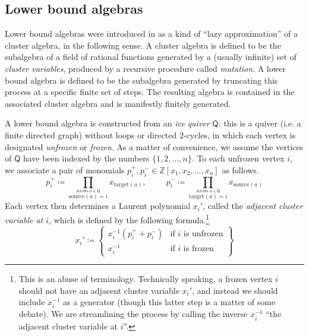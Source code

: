 \documentclass[10pt]{amsart}
\numberwithin{equation}{section}
\theoremstyle{definition}
\theoremstyle{remark}
\newcommand{\1}{^{-1}}
\def\ZZ{\mathbb{Z}}
\def\Q{\mathsf{Q}}
\begin{document}
\subsection{Lower bound algebras}

Lower bound algebras were introduced in \cite{BFZ05} as a kind of ``lazy approximation'' of a cluster algebra, in the following sense.  A cluster algebra is defined to be the subalgebra of a field of rational functions generated by a (usually infinite) set of \emph{cluster variables}, produced by a recursive procedure called \emph{mutation}.  A lower bound algebra is defined to be the subalgebra generated by truncating this process at a specific finite set of steps.  The resulting algebra is contained in the associated cluster algebra and is manifestly finitely generated.

A lower bound algebra is constructed from an \textit{ice quiver} $\Q$: this is a quiver (i.e. a finite directed graph) without loops or directed $2$-cycles, in which each vertex is designated \textit{unfrozen} or \textit{frozen}.
As a matter of convenience, we assume the vertices of $\Q$ have been indexed by the numbers $\{1,2,\dots,n\}$.  To each unfrozen vertex $i$, we associate a pair of monomials $p_i^+,p_i^-\in \ZZ[x_1,x_2,\dots,x_n]$ as follows.
\begin{equation}
p_i^+ \coloneqq \prod_{\stackrel{\text{arrows }a\in \Q}{\text{source}(a)=i}}x_{\text{target}(a)},\hspace{1cm} p_i^- \coloneqq \prod_{\stackrel{\text{arrows }a\in \Q}{\text{target}(a)=i}}x_{\text{source}(a)}
\end{equation}
Each vertex then determines a Laurent polynomial $x_i'$, called the \textit{adjacent cluster variable at $i$}, which is defined by the following formula.\footnote{This is an abuse of terminology.  Technically speaking, a frozen vertex $i$ should not have an adjacent cluster variable $x_i'$, and instead we should include $x_i^{-1}$ as a generator (though this latter step is a matter of some debate).  We are streamlining the process by calling the inverse $x_i^{-1}$ ``the adjacent cluster variable at $i$''.}
\begin{equation}%
x_i' \coloneqq \left\{\begin{array}{cc}
x_i^{-1}(p_i^++p_i^-) & \text{if $i$ is unfrozen} \\
x_i^{-1} & \text{if $i$ is frozen}
\end{array}\right\}
\end{equation}
\end{document}
